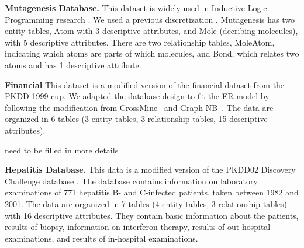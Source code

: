 \documentclass{article}
\begin{document}
\noindent\textbf{Mutagenesis Database.}  This dataset is widely used in Inductive Logic Programming research \cite{Srinivasan1996}. %
We used a previous discretization \cite{Schulte2012}.
Mutagenesis has two entity tables, Atom with 3 descriptive attributes, and Mole (decribing molecules), with 5 descriptive attributes. 
There are two relationship tables, MoleAtom, indicating which atoms are parts of which molecules, and Bond, which relates two atoms and has 1 descriptive attribute. 

\noindent\textbf{Financial} 
This dataset is a modified version of the financial dataset from the PKDD 1999 cup. We adapted the database design to fit the ER model by following the
modification from CrossMine~\cite{Yin2004} and Graph-NB~\cite{han2009}.
 The data are organized in 6 tables (3 entity tables, 3 relationship tables, 15 descriptive attributes).

need to be filled in more details

\noindent\textbf{Hepatitis Database.} This data is a modified version of the PKDD02 Discovery Challenge database \cite{Frank2007}. %
The database contains information on laboratory examinations of 771 hepatitis B- and C-infected patients, taken
between 1982 and 2001. The data are organized in 7 tables (4 entity tables,  3 relationship tables) with 16 descriptive attributes. They contain basic information about the patients, results of biopsy, information on interferon therapy, results of out-hospital examinations, and results of in-hospital examinations. 
\end{document}
